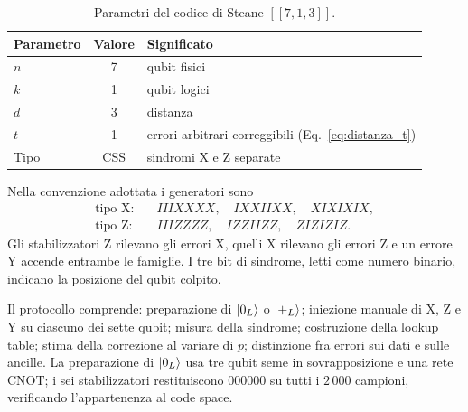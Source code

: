 \begin{onehalfspace}
\begin{table}[H]
\centering
\begin{tabular}{lcl}
\toprule
\textbf{Parametro} & \textbf{Valore} & \textbf{Significato} \\
\midrule
$n$ & 7 & qubit fisici \\
\addlinespace[0.3em]
$k$ & 1 & qubit logici \\
\addlinespace[0.3em]
$d$ & 3 & distanza \\
\addlinespace[0.3em]
$t$ & 1 & errori arbitrari correggibili (Eq.~\ref{eq:distanza_t}) \\
\addlinespace[0.3em]
Tipo & \ac{CSS} & sindromi X e Z separate \\
\bottomrule
\end{tabular}
\caption[Parametri del codice di Steane]{Parametri del codice di Steane $[[7,1,3]]$.}\label{tab:steane_parametri}

\end{table}

Nella convenzione adottata i generatori sono
\begin{equation}
\begin{aligned}
\text{tipo X:}\quad & IIIXXXX,\quad IXXIIXX,\quad XIXIXIX,\\
\text{tipo Z:}\quad & IIIZZZZ,\quad IZZIIZZ,\quad ZIZIZIZ.
\end{aligned}
\label{eq:steane_stabilizzatori}
\end{equation}
Gli stabilizzatori Z rilevano gli errori X, quelli X rilevano gli errori
Z e un errore Y accende entrambe le famiglie. I tre bit di sindrome,
letti come numero binario, indicano la posizione del qubit colpito.

Il protocollo comprende: preparazione di $\ket{0_L}$ o $\ket{+_L}$;
iniezione manuale di X, Z e Y su ciascuno dei sette qubit; misura della
sindrome; costruzione della lookup table; stima della correzione al
variare di $p$; distinzione fra errori sui dati e sulle ancille. La
preparazione di $\ket{0_L}$ usa tre qubit seme in sovrapposizione e una
rete CNOT; i sei stabilizzatori restituiscono $000000$ su tutti i
$2\,000$ campioni, verificando l'appartenenza al code space.

\begin{table}[H]


\end{table}
\end{onehalfspace}
